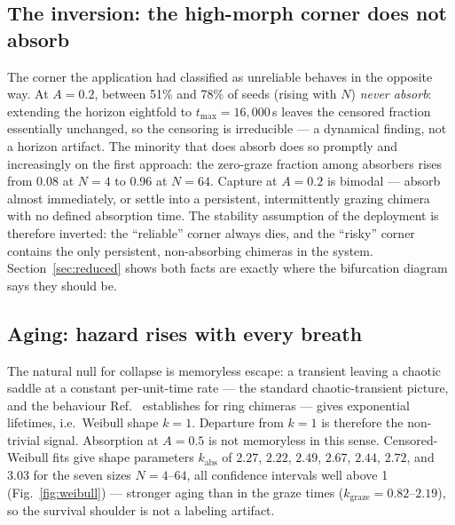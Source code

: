 \documentclass[pdflatex,sn-mathphys,Numbered]{sn-jnl}
\begin{document}
\subsection{The inversion: the high-morph corner does not absorb}

The corner the application had classified as unreliable behaves in the opposite way.
At $A = 0.2$, between 51\% and 78\% of seeds (rising with $N$) \emph{never absorb}:
extending the horizon eightfold to $t_{\max} = 16{,}000$\,s leaves the censored
fraction essentially unchanged, so the censoring is irreducible --- a dynamical
finding, not a horizon artifact. The minority that does absorb does so promptly and
increasingly on the first approach: the zero-graze fraction among absorbers rises
from 0.08 at $N = 4$ to 0.96 at $N = 64$. Capture at $A = 0.2$ is bimodal ---
absorb almost immediately, or settle into a persistent, intermittently grazing
chimera~\cite{sudaokuda2015} with no defined absorption time. The stability assumption of the deployment is
therefore inverted: the ``reliable'' corner always dies, and the ``risky'' corner
contains the only persistent, non-absorbing chimeras in the system. Section~\ref{sec:reduced} shows
both facts are exactly where the bifurcation diagram says they should be.

\subsection{Aging: hazard rises with every breath}

The natural null for collapse is memoryless escape: a transient leaving a chaotic saddle at a constant per-unit-time rate --- the standard chaotic-transient picture, and the behaviour Ref.~\cite{wo2011} establishes for ring chimeras --- gives exponential lifetimes, i.e.\ Weibull shape $k = 1$. Departure from $k = 1$ is therefore the non-trivial signal. Absorption at $A = 0.5$ is not memoryless in this sense. Censored-Weibull fits give shape
parameters $k_{\mathrm{abs}}$ of $2.27$, $2.22$, $2.49$, $2.67$, $2.44$, $2.72$, and
$3.03$ for the seven sizes $N = 4$--$64$, all confidence intervals well above 1 (Fig.~\ref{fig:weibull}) ---
stronger aging than in the graze times ($k_{\mathrm{graze}} = 0.82$--$2.19$), so the
survival shoulder is not a labeling artifact.
\end{document}

